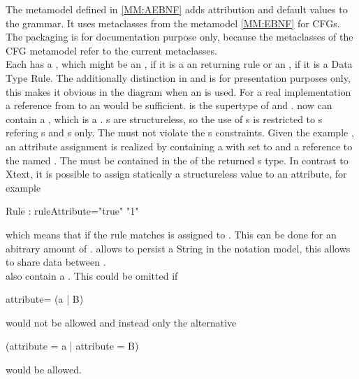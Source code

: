 The metamodel defined in \ref{MM:AEBNF} adds attribution and default values to the grammar. It uses metaclasses from the metamodel \ref{MM:EBNF} for CFGs. The packaging is for documentation purpose only, because the metaclasses of the CFG metamodel refer to the current metaclasses. \\
Each  has a , which might be an , if it is a an  returning rule or an , if it is a Data Type Rule. The additionally distinction in  and  is for presentation purposes only, this makes it obvious in the diagram when an  is used. For a real implementation a reference from  to an  would be sufficient.  is the supertype of  and .  now can contain a  , which is a .  s are structureless, so the use of s is restricted to  s refering s and  s only. The   must not violate the  s constraints. Given the example , an attribute assignment is realized by  containing a   with  set to   and a reference to the   named . The  must be contained in the   of the returned s type. In contrast to Xtext, it is possible to assign statically a structureless value to an attribute, for example 
\begin{xtxt}
Rule : {ruleAttribute="true"} "1"
\end{xtxt}   
which means that if the rule matches  is assigned to . This can be done for an abitrary amount of .  allows to persist a String in the notation model, this allows to share data between . \\
 also contain a . This could be omitted if 
\begin{xtxt}
attribute= (a | B)
\end{xtxt}
would not be allowed and instead only the alternative 
\begin{xtxt}
(attribute = a | attribute = B)
\end{xtxt}
would be allowed.

